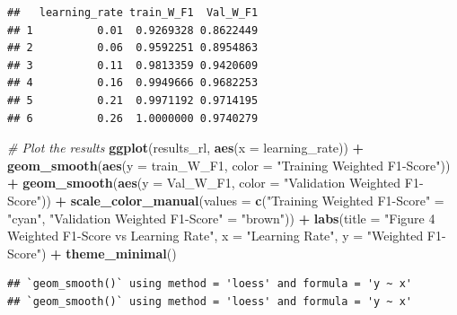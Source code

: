 \documentclass[
]{article}
\newenvironment{Shaded}{\begin{snugshade}}{\end{snugshade}}
\newcommand{\AttributeTok}[1]{\textcolor[rgb]{0.13,0.29,0.53}{#1}}
\newcommand{\CommentTok}[1]{\textcolor[rgb]{0.56,0.35,0.01}{\textit{#1}}}
\newcommand{\FunctionTok}[1]{\textcolor[rgb]{0.13,0.29,0.53}{\textbf{#1}}}
\newcommand{\NormalTok}[1]{#1}
\newcommand{\OtherTok}[1]{\textcolor[rgb]{0.56,0.35,0.01}{#1}}
\newcommand{\SpecialCharTok}[1]{\textcolor[rgb]{0.81,0.36,0.00}{\textbf{#1}}}
\newcommand{\StringTok}[1]{\textcolor[rgb]{0.31,0.60,0.02}{#1}}
\begin{document}
\begin{verbatim}
##   learning_rate train_W_F1  Val_W_F1
## 1          0.01  0.9269328 0.8622449
## 2          0.06  0.9592251 0.8954863
## 3          0.11  0.9813359 0.9420609
## 4          0.16  0.9949666 0.9682253
## 5          0.21  0.9971192 0.9714195
## 6          0.26  1.0000000 0.9740279
\end{verbatim}

\begin{Shaded}
\begin{Highlighting}[]
\CommentTok{\# Plot the results}
\FunctionTok{ggplot}\NormalTok{(results\_rl, }\FunctionTok{aes}\NormalTok{(}\AttributeTok{x =}\NormalTok{ learning\_rate)) }\SpecialCharTok{+}
  \FunctionTok{geom\_smooth}\NormalTok{(}\FunctionTok{aes}\NormalTok{(}\AttributeTok{y =}\NormalTok{ train\_W\_F1, }\AttributeTok{color =} \StringTok{"Training Weighted F1{-}Score"}\NormalTok{)) }\SpecialCharTok{+}
  \FunctionTok{geom\_smooth}\NormalTok{(}\FunctionTok{aes}\NormalTok{(}\AttributeTok{y =}\NormalTok{ Val\_W\_F1, }\AttributeTok{color =} \StringTok{"Validation Weighted F1{-}Score"}\NormalTok{)) }\SpecialCharTok{+}
  \FunctionTok{scale\_color\_manual}\NormalTok{(}\AttributeTok{values =} \FunctionTok{c}\NormalTok{(}\StringTok{"Training Weighted F1{-}Score"} \OtherTok{=} \StringTok{"cyan"}\NormalTok{,}
                                \StringTok{"Validation Weighted F1{-}Score"} \OtherTok{=} \StringTok{"brown"}\NormalTok{)) }\SpecialCharTok{+}
  \FunctionTok{labs}\NormalTok{(}\AttributeTok{title =} \StringTok{"Figure 4 Weighted F1{-}Score vs Learning Rate"}\NormalTok{,}
       \AttributeTok{x =} \StringTok{"Learning Rate"}\NormalTok{, }\AttributeTok{y =} \StringTok{"Weighted F1{-}Score"}\NormalTok{) }\SpecialCharTok{+}
  \FunctionTok{theme\_minimal}\NormalTok{()}
\end{Highlighting}
\end{Shaded}

\begin{verbatim}
## `geom_smooth()` using method = 'loess' and formula = 'y ~ x'
## `geom_smooth()` using method = 'loess' and formula = 'y ~ x'
\end{verbatim}
\end{document}
